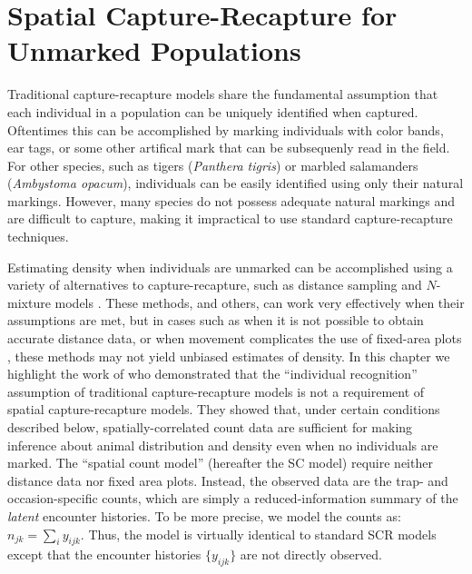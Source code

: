 \chapter{Spatial Capture-Recapture for Unmarked Populations}
\label{chapt.scr-unmarked}

\vspace{0.3cm}


Traditional capture-recapture models share the fundamental
assumption that each individual in a population can be uniquely
identified when captured. Oftentimes this can be accomplished
by marking individuals with color bands, ear tags, or some other
artifical mark that can be subsequenly read in the field. For other
species, such as tigers (\textit{Panthera tigris}) or
marbled salamanders (\textit{Ambystoma opacum}),
individuals can be easily identified
using only their natural markings. However, many species
do not possess adequate natural markings and are
difficult to capture, making it impractical to use standard
capture-recapture techniques.

Estimating density when individuals are unmarked can be accomplished
using a variety of alternatives to capture-recapture, such as distance
sampling \citep{buckland_etal:2001} and $N$-mixture models
\citep{royle:2004biom}. These methods, and others, can work
very effectively when their assumptions are met, but in cases such as
when it is not possible to obtain accurate distance data, or when
movement complicates the use of fixed-area plots \citep{chandler_etal:2011},
these methods may not
yield unbiased estimates of density. In this chapter we highlight the work of
\citet{chandler_royle:2012} who demonstrated that the ``individual
recognition'' assumption of traditional capture-recapture models is not a
requirement of spatial capture-recapture models. They showed that,
under certain conditions described below, spatially-correlated count
data are sufficient for making inference about animal distribution and
density even when no individuals are marked.
The \citet{chandler_royle:2012} ``spatial count model'' (hereafter the SC
model) require neither distance data nor fixed area plots. Instead,
the observed data are the trap- and occasion-specific counts, which
are simply a reduced-information summary of the \textit{latent}
encounter histories. To be more precise, we model the counts as:
$n_{jk} = \sum_i y_{ijk}$. Thus, the model
is virtually identical to standard SCR models except that the
encounter histories $\{y_{ijk}\}$ are not directly observed.

